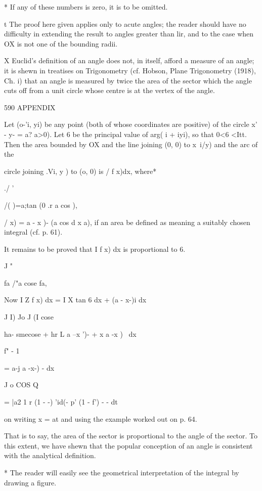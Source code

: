 * If any of these numbers is zero, it is to be omitted.

t The proof here given applies only to acute angles; the reader
should have no difficulty in extending the result to angles greater
than lir, and to the case when OX is not one of the bounding radii.

X Euclid's definition of an angle does not, in itself, afford a
measure of an angle; it is shewn in treatises on Trigonometry (cf.
Hobson, Plane Trigonometry (1918), Ch. i) that an angle is measured by
twice the area of the sector which the angle cuts off from a unit
circle whose centre is at the vertex of the angle.



590 APPENDIX

Let (o-'i, yi) be any point (both of whose coordinates are positive)
of the circle x' - y- = a? a>0). Let 6 be the principal value of arg(
i + iyi), so that 0<6 <Itt. Then the area bounded by OX and the line
joining (0, 0) to x\, i/y) and the arc of the

circle joining .Vi, y ) to (o, 0) is / f x)dx, where*

./ '

/( )=a;tan (0 .r a cos ),

/ x) = a - x )- (a cos d x a), if an area be defined as meaning a
suitably chosen integral (cf. p. 61).

It remains to be proved that I f x) dx is proportional to 6.

J "

fa /"a cose fa,

Now I Z f x) dx = I X tan 6 dx + (a - x-)i dx

J I) Jo J (I cose

 ha- smecose + hr L a --x ')- + x a -x ) \ dx

f" - 1

= a-j a -x-) - dx

J o COS Q

= |a2 1 r (1 - -) 'id(- p' (1 - f') - - dt\

on writing x = at and using the example worked out on p. 64.

That is to say, the area of the sector is proportional to the angle of
the sector. To this extent, we have shewn that the popular conception
of an angle is consistent with the analytical definition.

* The reader will easily see the geometrical interpretation of the
integral by drawing a figure.